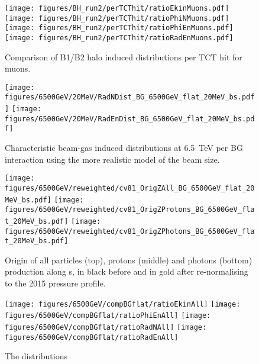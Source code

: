 \begin{figure}%
\begin{center}
  \texttt{[image: figures/BH\_run2/perTCThit/ratioEkinMuons.pdf]}
  \texttt{[image: figures/BH\_run2/perTCThit/ratioPhiNMuons.pdf]}
  \texttt{[image: figures/BH\_run2/perTCThit/ratioPhiEnMuons.pdf]}
  \texttt{[image: figures/BH\_run2/perTCThit/ratioRadEnMuons.pdf]}
\end{center}
\vspace{-0.6cm}
 \caption{Comparison of B1/B2 halo induced distributions per TCT hit for muons.
  \label{compBHB1B2run2}}
\end{figure}

\clearpage

\begin{figure}%
\begin{center}
  \texttt{[image: figures/6500GeV/20MeV/RadNDist\_BG\_6500GeV\_flat\_20MeV\_bs.pdf]}
  \texttt{[image: figures/6500GeV/20MeV/RadEnDist\_BG\_6500GeV\_flat\_20MeV\_bs.pdf]}
\end{center}
\vspace{-0.6cm}
 \caption{Characteristic beam-gas induced distributions at 6.5~TeV per BG interaction using the more realistic model of the beam size.
  \label{bg65002}}
\end{figure}

\begin{figure}
\begin{center}
  \texttt{[image: figures/6500GeV/reweighted/cv81\_OrigZAll\_BG\_6500GeV\_flat\_20MeV\_bs.pdf]}
  \texttt{[image: figures/6500GeV/reweighted/cv81\_OrigZProtons\_BG\_6500GeV\_flat\_20MeV\_bs.pdf]}
  \texttt{[image: figures/6500GeV/reweighted/cv81\_OrigZPhotons\_BG\_6500GeV\_flat\_20MeV\_bs.pdf]}
\end{center}
\vspace{-0.6cm}
 \caption{Origin of all particles (top), protons (middle) and photons (bottom) production along s, in black before and in gold after re-normalising to the 2015 pressure profile. 
  \label{fig:OrigZ6p52}}
\end{figure}


\begin{figure}
\begin{center}
  \texttt{[image: figures/6500GeV/compBGflat/ratioEkinAll]}
  \texttt{[image: figures/6500GeV/compBGflat/ratioPhiEnAll]}
  \texttt{[image: figures/6500GeV/compBGflat/ratioRadNAll]}
  \texttt{[image: figures/6500GeV/compBGflat/ratioRadEnAll]}
\end{center}
\vspace{-0.6cm}
 \caption{The distributions 
  \label{fig:EkinPhiEn6p52}}
\end{figure}



